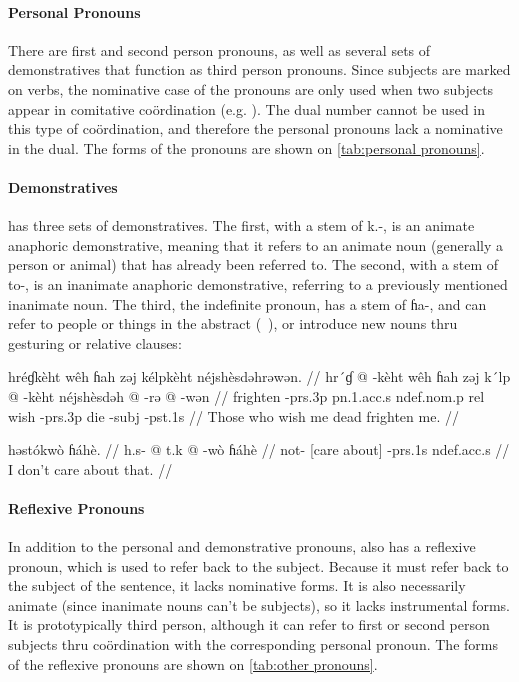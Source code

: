 \paragraph{Personal Pronouns} There are first and second person pronouns, as
well as several sets of demonstratives that function as third person pronouns.
Since subjects are marked on verbs, the nominative case of the pronouns are
only used when two subjects appear in comitative coördination (e.g. ). The dual number cannot be used in this type of coördination,
and therefore the personal pronouns lack a nominative in the dual. The forms of
the pronouns are shown on \cref{tab:personal pronouns}.

\paragraph{Demonstratives} \Langname{} has three sets of demonstratives. The
first, with a stem of {\ll k.-}, is an animate anaphoric demonstrative, meaning
that it refers to an animate noun (generally a person or animal) that has
already been referred to. The second, with a stem of {\ll to-}, is an
inanimate anaphoric demonstrative, referring to a previously mentioned
inanimate noun. The third, the indefinite pronoun, has a stem of {\ll ɦa-}, and
can refer to people or things in the abstract (\ie\ ), or introduce
new nouns thru gesturing or relative clauses:

\pex
\a
\begingl
\glpreamble hréɠkèht wêh ɦah zəj kélpkèht néjshèsdəhrəwən. //
\gla hr´ɠ @ -kèht wêh ɦah zəj k´lp @ -kèht néjshèsdəh @ -rə @
-wən //
\glb frighten -{\sc prs}.3p {\sc pn}.1.{\sc acc}.s {\sc ndef}.{\sc nom}.p {\sc
    rel} wish -{\sc prs}.3p die -{\sc subj} -{\sc pst}.1s //
\glft Those who wish me dead frighten me. //
\endgl

\a
\begingl
    \glpreamble həstókwò ɦáhè. //
    \gla h.s- @ t.k @ -wò ɦáhè //
    \glb not- {[care about]} -{\sc prs}.1s {\sc ndef}.{\sc acc}.s //
    \glft I don't care about that. //
\endgl
\xe

\paragraph{Reflexive Pronouns} In addition to the personal and demonstrative
pronouns, \Langname{} also has a reflexive pronoun, which is used to
refer back to the subject. Because it must refer back to the subject of the
sentence, it lacks nominative forms. It is also necessarily animate (since
inanimate nouns can't be subjects), so it lacks instrumental forms. It is
prototypically third person, although it can refer to first or second person
subjects thru coördination with the corresponding personal pronoun. The forms
of the reflexive pronouns are shown on \cref{tab:other pronouns}.

